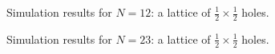 \documentclass[aps]{revtex4}
\begin{document}
\begin{figure}[H]
\caption{\label{fig:n12}Simulation results for $N=12$: a lattice of $\frac{1}{2} \times \frac{1}{2}$ holes.}
\end{figure}

\begin{figure}[H]
\caption{\label{fig:n23}Simulation results for $N=23$: a lattice of $\frac{1}{2} \times \frac{1}{2}$ holes.}
\end{figure}
\end{document}
